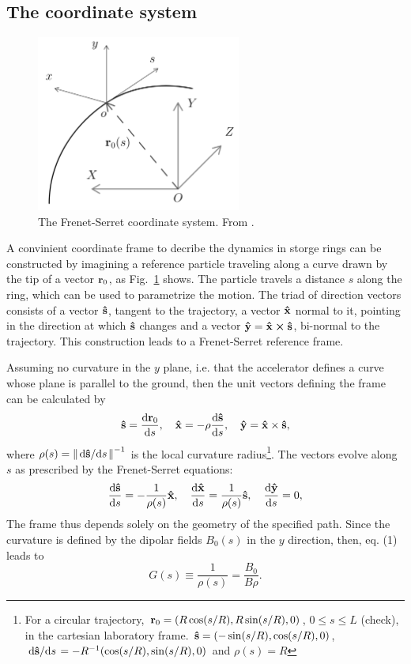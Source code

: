 \subsection{The coordinate system}
\begin{figure}[htb]
    \centering
    \includegraphics[width=0.6\textwidth]{Images/frenetserret.png}
    \caption{The Frenet-Serret coordinate system. From \cite{huang2019beam}.}
    \label{frenetserret}
\end{figure}
A convinient coordinate frame to decribe the dynamics in storge rings can be constructed by imagining a reference particle traveling along a curve drawn by the tip of a vector $\vb{r}_0$, as Fig.~\ref{frenetserret} shows. The particle travels a distance $s$ along the ring, which can be used to parametrize the motion. The triad of direction vectors consists of a vector $\vu{s}$, tangent to the trajectory, a vector $\vu{x}$ normal to it, pointing in the direction at which $\vu{s}$ changes and a vector $\vu{y}=\vu{x}\cross\vu{s}$, bi-normal to the trajectory. This construction leads to a Frenet-Serret reference frame.

Assuming no curvature in the $y$ plane, i.e. that the accelerator defines a curve whose plane is parallel to the ground, then the unit vectors defining the frame can be calculated by\cite{lee}
\begin{equation}
\vu{s}=\dv{\vb{r}_{0}}{s}, \quad \vu{x}=-\rho\dv{\vu{s}}{s}, \quad \vu{y} =  \vu{x}\times\vu{s},
\end{equation}
where $\rho(s) = \norm{\dv*{\vu{s}}{s}}^{-1}$ is the local curvature radius\footnote{For a circular trajectory, $\vb{r}_0 = (R\cos(s/R), R\sin(s/R), 0)$, $ 0\leq s \leq L$ (check), in the cartesian laboratory frame. $\vu{s}=(-\sin(s/R), \cos(s/R), 0)$, $\dv*{\vu{s}}{s} = -R^{-1}(\cos(s/R),\sin(s/R), 0 )$ and $\rho(s)=R$}. The vectors evolve along $s$ as prescribed by the Frenet-Serret equations:
\begin{equation}
\dv{\vu{s}}{s}=-\frac{1}{\rho(s)}\vu{x}, \quad\dv{\vu{x}}{s}=\frac{1}{\rho(s)}\vu{s}, \quad \dv{\vu{y}}{s}=0,
\end{equation}
The frame thus depends solely on the geometry of the specified path. Since the curvature is defined by the dipolar fields $B_0(s)$ in the $y$ direction, then, eq. (1) leads to
    \begin{equation}
        G(s) \equiv \frac{1}{\rho(s)} = \frac{B_0}{B\rho}.
        \label{G}
    \end{equation}


